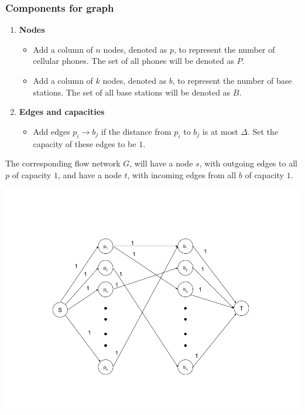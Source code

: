 \documentclass[11pt]{scrartcl}
\begin{document}
\subsubsection{
	Components for graph
}
\begin{enumerate}[label=\alph*.]
	\item{
	      \textbf{Nodes}
	      \begin{itemize}
		      \item Add a column of $n$ nodes, denoted as $p$, to represent the number of cellular phones. The set of all phones will be denoted as $P$.
		      \item Add a column of $k$ nodes, denoted as $b$, to represent the number of base stations. The set of all base stations will be denoted as $B$.
	      \end{itemize}
	      }
	\item{
	      \textbf{Edges and capacities}
	      \begin{itemize}
		      \item{
		            Add edges $p_i \rightarrow b_j$ if the distance from $p_i$ to $b_j$ is at most $\Delta$.
		            Set the capacity of these edges to be $1$.
		            }
	      \end{itemize}
	      }
\end{enumerate}
The corresponding flow network $G$, will have a node $s$, with outgoing edges to all $p$ of capacity $1$, and
have a node $t$, with incoming edges from all $b$ of capacity $1$.
\begin{center}
	\includegraphics[scale=0.4]{p2hw6}
\end{center}
\end{document}
